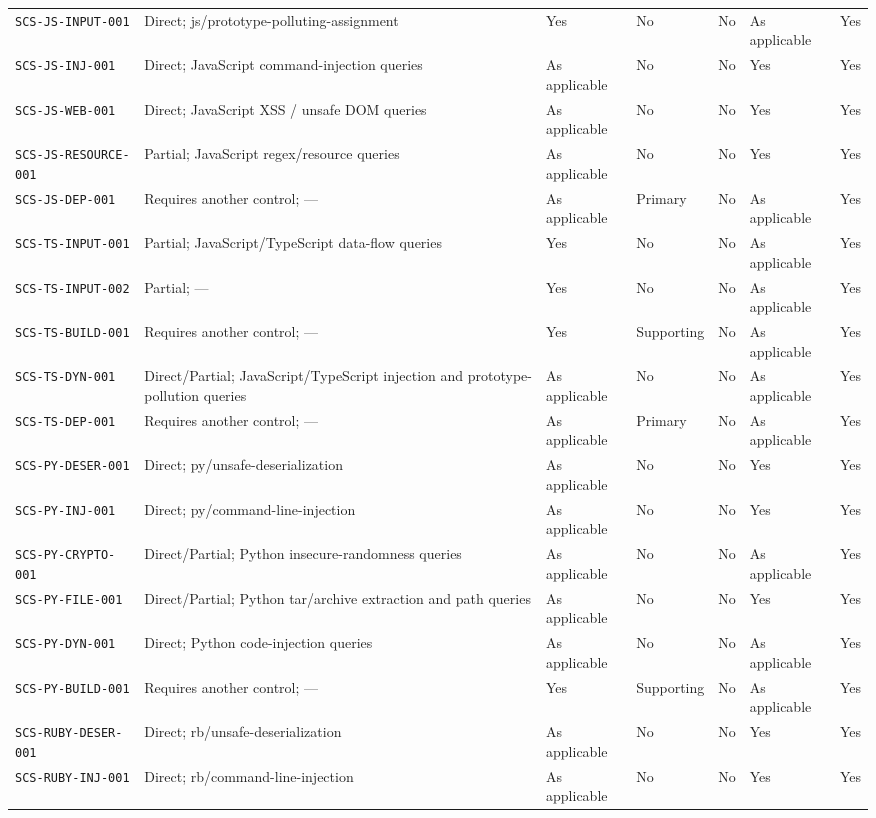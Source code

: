 \documentclass[10pt,letterpaper]{article}
\newcommand{\code}[1]{\begingroup\small\ttfamily\def\UrlFont{\ttfamily}\nolinkurl{#1}\endgroup}
\begin{document}
\begin{landscape}
\begin{longtable}{@{}P{1.4in}P{1.35in}P{1.1in}P{1.1in}P{0.95in}P{1.3in}P{1.0in}@{}}
\code{SCS-JS-INPUT-001} & Direct; js/prototype-polluting-assignment & Yes & No & No & As applicable & Yes\\
\code{SCS-JS-INJ-001} & Direct; JavaScript command-injection queries & As applicable & No & No & Yes & Yes\\
\code{SCS-JS-WEB-001} & Direct; JavaScript XSS / unsafe DOM queries & As applicable & No & No & Yes & Yes\\
\code{SCS-JS-RESOURCE-001} & Partial; JavaScript regex/resource queries & As applicable & No & No & Yes & Yes\\
\code{SCS-JS-DEP-001} & Requires another control; — & As applicable & Primary & No & As applicable & Yes\\
\code{SCS-TS-INPUT-001} & Partial; JavaScript/\allowbreak TypeScript data-flow queries & Yes & No & No & As applicable & Yes\\
\code{SCS-TS-INPUT-002} & Partial; — & Yes & No & No & As applicable & Yes\\
\code{SCS-TS-BUILD-001} & Requires another control; — & Yes & Supporting & No & As applicable & Yes\\
\code{SCS-TS-DYN-001} & Direct/Partial; JavaScript/\allowbreak TypeScript injection and prototype-pollution queries & As applicable & No & No & As applicable & Yes\\
\code{SCS-TS-DEP-001} & Requires another control; — & As applicable & Primary & No & As applicable & Yes\\
\code{SCS-PY-DESER-001} & Direct; py/unsafe-deserialization & As applicable & No & No & Yes & Yes\\
\code{SCS-PY-INJ-001} & Direct; py/command-line-injection & As applicable & No & No & Yes & Yes\\
\code{SCS-PY-CRYPTO-001} & Direct/Partial; Python insecure-randomness queries & As applicable & No & No & As applicable & Yes\\
\code{SCS-PY-FILE-001} & Direct/Partial; Python tar/archive extraction and path queries & As applicable & No & No & Yes & Yes\\
\code{SCS-PY-DYN-001} & Direct; Python code-injection queries & As applicable & No & No & As applicable & Yes\\
\code{SCS-PY-BUILD-001} & Requires another control; — & Yes & Supporting & No & As applicable & Yes\\
\code{SCS-RUBY-DESER-001} & Direct; rb/unsafe-deserialization & As applicable & No & No & Yes & Yes\\
\code{SCS-RUBY-INJ-001} & Direct; rb/command-line-injection & As applicable & No & No & Yes & Yes\\

\end{longtable}
\end{landscape}
\end{document}
